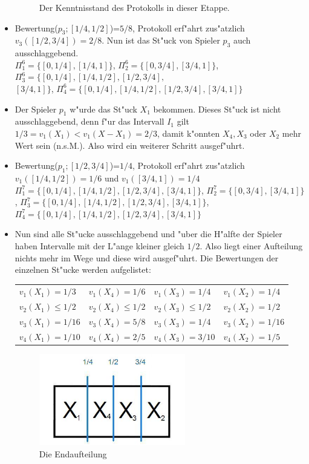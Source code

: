 \documentclass[11pt, a4paper, twoside]{article}
\numberwithin{equation}{section}
\begin{document}
\begin{itemize}
\begin{figure}[h!]
\caption[Beispiel zu Procaccias Teilungsspiel 1/2]{Der Kenntnisstand des Protokolls in dieser Etappe.}
\end{figure}  
\item Bewertung($p_3;[1/4,1/2]$)=$5/8$, Protokoll erf"ahrt zus"atzlich $v_3([1/2,3/4])=2/8$. Nun ist das St"uck von Spieler $p_3$  auch ausschlaggebend.\\ $\Pi_1^6=\{[0,1/4],[1/4,1]\}$, $\Pi_2^6=\{[0,3/4],[3/4,1]\}$, $\Pi_3^6=\{[0,1/4],[1/4,1/2],[1/2,3/4],$\\ $[3/4,1]\}$, $\Pi_4^6=\{[0,1/4],[1/4,1/2],[1/2,3/4],[3/4,1]\}$
\item Der Spieler $p_1$ w"urde das St"uck $X_1$ bekommen. Dieses St"uck ist nicht ausschlaggebend, denn f"ur das Intervall $I_1$ gilt $1/3=v_1(X_1)<v_1(X-X_1)=2/3$, damit k"onnten $X_4, X_3$ oder $X_2$ mehr Wert sein (n.s.M.). Also wird ein weiterer Schritt ausgef"uhrt.
\item  Bewertung($p_1;[1/2,3/4]$)=$1/4$, Protokoll erf"ahrt zus"atzlich $v_1([1/4,1/2])=1/6$ und $v_1([3/4,1])=1/4$ \\ $\Pi_1^7=\{[0,1/4],[1/4,1/2],[1/2,3/4],[3/4,1]\}$, $\Pi_2^7=\{[0,3/4],[3/4,1]\}$, $\Pi_3^7=\{[0,1/4],[1/4,1/2],[1/2,3/4],[3/4,1]\}$, $\Pi_4^7=\{[0,1/4],[1/4,1/2],[1/2,3/4],[3/4,1]\}$
\item Nun sind alle St"ucke ausschlaggebend und "uber die H"alfte der Spieler haben Intervalle mit der L"ange kleiner gleich $1/2$. Also liegt einer Aufteilung nichts mehr im Wege und diese wird ausgef"uhrt. Die Bewertungen der einzelnen St"ucke werden aufgelistet:\\
\newline
\begin{tabular}{llll}
$v_1(X_1)=1/3$ & $v_1(X_4)=1/6$ & $v_1(X_3)=1/4$ & $v_1(X_2)=1/4$\\
$v_2(X_1)\leq1/2$ & $v_2(X_4)\leq1/2$ & $v_2(X_3)\leq1/2$ & $v_2(X_2)=1/2$\\
$v_3(X_1)=1/16$ & $v_3(X_4)=5/8$ & $v_3(X_3)=1/4$ & $v_3(X_2)=1/16$\\
$v_4(X_1)=1/10$ & $v_4(X_4)=2/5$ & $v_4(X_3)=3/10$ & $v_4(X_2)=1/5$
\end{tabular}
\begin{figure}[h!]
\center
\includegraphics[height=4cm]{kk4.jpg}
\caption[Beispiel zu Procaccias Teilungsspiel]{Die Endaufteilung}
\end{figure}  
\end{itemize}\newpage
\end{document}
